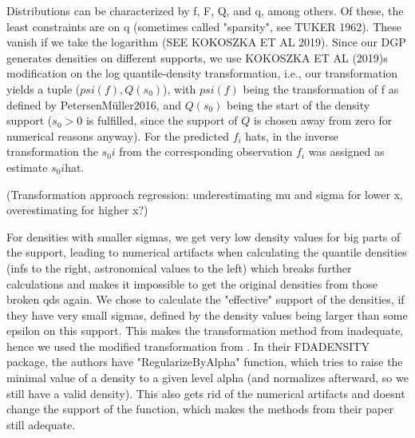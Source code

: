 Distributions can be characterized by f, F, Q, and q, among others. Of these, the least 
constraints are on q (sometimes called "sparsity", see TUKER 1962). These vanish if we
take the logarithm (SEE KOKOSZKA ET AL 2019). Since our DGP generates densities on
different supports, we use KOKOSZKA ET AL (2019)s modification on the log quantile-density
transformation, i.e., our transformation yields a tuple ($psi(f), Q(s_0)$), with
$psi(f)$ being the transformation of f as defined by {PetersenMüller2016}, and
$Q(s_0)$ being the start of the density support ($s_0 > 0$ is fulfilled, since the support
of $Q$ is chosen away from zero for numerical reasons anyway). For the predicted $f_i$ hats,
in the inverse transformation the $s_0i$ from the corresponding observation $f_i$ was
assigned as estimate $s_0i$hat.

(Transformation approach regression: underestimating mu and sigma for lower x,
overestimating for higher x?) \citet{PetersenLiuDivani2021}

For densities with smaller sigmas, we get very low density values for big parts of the
support, leading to numerical artifacts when calculating the quantile densities (infs
to the right, astronomical values to the left) which breaks further calculations and
makes it impossible to get the original densities from those broken qds again. We chose
to calculate the "effective" support of the densities, if they have very small sigmas,
defined by the density values being larger than some epsilon on this support. This
makes the transformation method from \citet{PetersenMüller2016} inadequate, hence we 
used the modified transformation from \citet{KokoszkaEtAl2019}. In their FDADENSITY
package, the authors have "RegularizeByAlpha" function, which tries to raise the minimal
value of a density to a given level alpha (and normalizes afterward, so we still have a 
valid density). This also gets rid of the numerical artifacts and doesnt change the 
support of the function, which makes the methods from their paper still adequate.